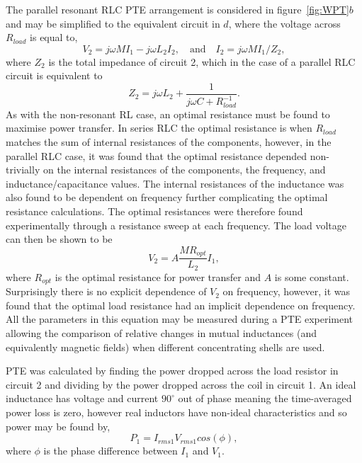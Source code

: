 \documentclass[11pt]{iopart}
\begin{document}
The parallel resonant RLC PTE arrangement is considered in
figure~\ref{fig:WPT}$b$ and may be simplified to the equivalent
circuit in $d$, where the voltage across $R_{load}$ is equal to,
\begin{equation}
 V_2 = j\omega MI_1 - j\omega L_2I_2,\quad\text{and}\quad
 I_2 = j\omega MI_1 / Z_2 ,
\end{equation}
where $Z_2$ is the total impedance of circuit 2, which in the case of
a parallel RLC circuit is equivalent to
\vspace{-0.5em}
\begin{equation}
  Z_2 = j\omega L_2 + \frac{1}{j\omega C + R_{load}^{-1}}.
\end{equation}
As with the non-resonant RL case, an optimal resistance must be found to maximise
power transfer. In series RLC the optimal resistance is when
$R_{load}$ matches the sum of internal resistances of the components,
however, in the parallel RLC case, it was found that the optimal
resistance depended non-trivially on the internal resistances of the
components, the frequency, and inductance/capacitance values. The
internal resistances of the inductance was also found to be dependent
on frequency further complicating the optimal resistance calculations.
The optimal resistances were therefore found experimentally through a
resistance sweep at each frequency.  The load voltage can then be
shown to be
\vspace{-0.5em}
\begin{equation}
    V_2 = A \frac{MR_{opt}}{L_2}I_1,
\label{eqn:RLC-M}
\end{equation}
where $R_{opt}$ is the optimal resistance for power transfer and $A$ is
some constant. Surprisingly there is no explicit dependence of $V_2$ on
frequency, however, it was found that the optimal load resistance had
an implicit dependence on frequency. All the parameters in this
equation may be measured during a PTE experiment allowing the
comparison of relative changes in mutual inductances (and equivalently
magnetic fields) when different concentrating shells are used.

PTE was calculated by finding the power dropped across the load
resistor in circuit 2 and dividing by the power dropped across the
coil in circuit 1. An ideal inductance has voltage and current
$90^\circ$ out of phase meaning the time-averaged power loss is zero,
however real inductors have non-ideal characteristics and so power may
be found by,
\begin{equation}
    P_1 = I_{rms1}V_{rms1}cos(\phi),
\label{eqn:P1}
\end{equation}
where $\phi$ is the phase difference between $I_1$ and $V_1$.
\end{document}
